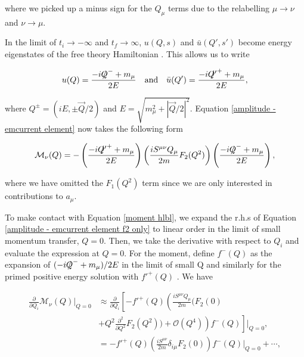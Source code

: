 \documentclass{article}
\numberwithin{equation}{section} %
\begin{document}
\noindent where we picked up a minus sign for the $Q_\mu$ terms due to the relabelling $\mu\rightarrow\nu$ and $\nu\rightarrow\mu$.

In the limit of $t_i \rightarrow -\infty$ and $t_f \rightarrow \infty$, $u(Q,s)$ and $\bar{u}(Q',s')$ become energy eigenstates of the free theory Hamiltonian \cite{tong}. This allows us to write

\begin{equation}
u(Q) = \frac{-i\slashed{Q}^-+m_\mu}{2E} \quad \mathrm{and} \quad \bar{u}(Q') = \frac{-i\slashed{Q'}^++m_\mu}{2E},
\end{equation}

\noindent where $Q^\pm = (iE,\pm \vec{Q}/2)$ and $E=\sqrt{m_\mu^2 + |\vec{Q}/2|^2}$. Equation \ref{amplitude - emcurrent element} now takes the following form

\begin{equation}
\mathcal{M}_\nu(Q) = -\left(\frac{-i\slashed{Q'}^++m_\mu}{2E}\right)\left( \frac{iS^{\mu\nu}Q_\mu}{2m}F_2(Q^2) \right)\left(\frac{-i\slashed{Q}^-+m_\mu}{2E}\right),
\label{amplitude - emcurrent element f2 only}
\end{equation}

\noindent where we have omitted the $F_1(Q^2)$ term since we are only interested in contributions to $a_\mu$.

To make contact with Equation \ref{moment hlbl}, we expand the r.h.s of Equation \ref{amplitude - emcurrent element f2 only} to linear order in the limit of small momentum transfer, $Q=0$. Then, we take the derivative with respect to $Q_i$ and evaluate the expression at $Q=0$. For the moment, define $f^{-}(Q)$ as the expansion of $(-i\slashed Q^{-} + m_\mu)/2E$ in the limit of small Q and similarly for the primed positive energy solution with $f'^+(Q)$ . We have 

\begin{equation}
\begin{split}
\frac{\partial}{\partial Q_i} \mathcal{M}_\nu(Q)\bigg\vert_{Q=0} &\approx \frac{\partial}{\partial Q_i}\left[-f'^+(Q)\left( \frac{iS^{\mu\nu}Q_\mu}{2m}(F_2(0) \right.\right. \\
& \left. \left. + Q^2\frac{\partial^2}{\partial Q^2}F_2(Q^2)) + \mathcal{O}(Q^4) \right)f^-(Q) \right]\bigg\vert_{Q=0},\\
&= -f'^+(Q)\left( \frac{iS^{\mu\nu}}{2m}\delta_{i\mu}F_2(0)\right)f^-(Q)\bigg\vert_{Q=0} + \cdots,\\
\end{split}
\label{moment - f2}
\end{equation}
\end{document}
